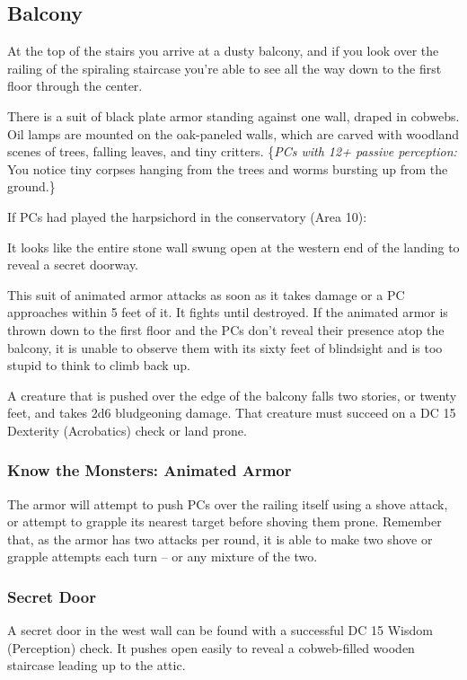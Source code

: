 \pagebreak
\subsection{Balcony}
\label{sec:Balcony}
\begin{readout}
  At the top of the stairs you arrive at a dusty balcony, and if you look over the railing of the spiraling
  staircase you're able to see all the way down to the first floor through the center.
  
  There is a suit of black plate armor standing against one wall, draped in cobwebs. Oil lamps are mounted
  on the oak-paneled walls, which are carved with woodland scenes of trees, falling leaves, and tiny critters.
  \{\textit{PCs with 12+ passive perception:} You notice tiny corpses hanging from the trees and worms bursting
  up from the ground.\}
\end{readout}

If PCs had played the harpsichord in the conservatory (Area 10):
\begin{readout}
  It looks like the entire stone wall swung open at the western end of the landing to reveal a secret doorway.
\end{readout}

This suit of animated armor attacks as soon as it takes damage or a PC approaches within 5 feet of it. It fights
until destroyed. If the animated armor is thrown down to the first floor and the PCs don't reveal their
presence atop the balcony, it is unable to observe them with its sixty feet of blindsight and is too stupid
to think to climb back up.

A creature that is pushed over the edge of the balcony falls two stories, or twenty feet, and takes 2d6
bludgeoning damage. That creature must succeed on a DC 15 Dexterity (Acrobatics) check or land prone.

\subsubsection*{Know the Monsters: Animated Armor}
The armor will attempt to push PCs over the railing itself using a shove attack, or attempt to grapple its 
nearest target before shoving them prone. Remember that, as the armor has two attacks per round, it is able to
make two shove or grapple attempts each turn -- or any mixture of the two.

\subsubsection*{Secret Door}
A secret door in the west wall can be found with a successful DC 15 Wisdom (Perception) check. It pushes open
easily to reveal a cobweb-filled wooden staircase leading up to the attic.

